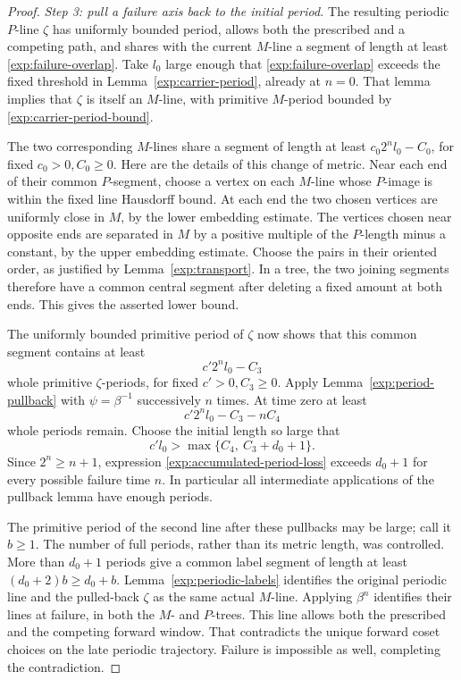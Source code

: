 \begin{proof}
\smallskip\noindent
\emph{Step 3: pull a failure axis back to the initial period.}
The resulting periodic $P$-line $\zeta$ has uniformly bounded period,
allows both the prescribed and a competing path, and shares with the current $M$-line a segment of length at least
\eqref{exp:failure-overlap}.
Take $l_0$ large enough that \eqref{exp:failure-overlap} exceeds
the fixed threshold in Lemma~\ref{exp:carrier-period}, already at
$n=0$. That lemma implies
that $\zeta$ is itself an $M$-line, with primitive
$M$-period bounded by \eqref{exp:carrier-period-bound}.

The two corresponding $M$-lines share a segment of length at
least $c_0 2^n l_0-C_0$, for fixed $c_0>0,C_0\ge0$.
Here are the details of this change of metric. Near each end of
their common $P$-segment, choose a vertex on each $M$-line whose
$P$-image is within the fixed line Hausdorff bound. At each end
the two chosen vertices are uniformly close in $M$, by the
lower embedding estimate. The vertices chosen near opposite
ends are separated in $M$ by a positive multiple of the
$P$-length minus a constant, by the upper embedding estimate.
Choose the pairs in their oriented order, as justified by
Lemma~\ref{exp:transport}. In a tree, the two joining segments
therefore have a common central segment after deleting a fixed
amount at both ends. This gives the asserted lower bound.

The uniformly bounded primitive period of $\zeta$ now shows
that this common segment contains at least
\begin{equation}
 c'2^n l_0-C_3
 \label{exp:initial-period-count}
\end{equation}
whole primitive $\zeta$-periods, for fixed $c'>0,C_3\ge0$.
Apply Lemma~\ref{exp:period-pullback} with $\psi=\beta^{-1}$
successively $n$ times. At time zero at least
\begin{equation}
 c'2^n l_0-C_3-nC_4
 \label{exp:accumulated-period-loss}
\end{equation}
whole periods remain. Choose the initial length so large that
\begin{equation}
 c'l_0>\max\{C_4,\ C_3+d_0+1\}.
 \label{exp:uniform-in-time}
\end{equation}
Since $2^n\ge n+1$, expression
\eqref{exp:accumulated-period-loss} exceeds $d_0+1$ for every
possible failure time $n$. In particular all intermediate
applications of the pullback lemma have enough periods.

The primitive period of the second line after these pullbacks
may be large; call it $b\ge1$. The number of full periods,
rather than its metric length, was controlled. More than
$d_0+1$ periods give a common label segment of length at least
$(d_0+2)b\ge d_0+b$. Lemma~\ref{exp:periodic-labels} identifies
the original periodic line and the pulled-back $\zeta$ as the
same actual $M$-line. Applying $\beta^n$ identifies their
lines at failure, in both the $M$- and $P$-trees. This line
allows both the prescribed and the competing forward window.
That contradicts the unique forward coset choices on the late
periodic trajectory. Failure is impossible as well, completing
the contradiction.
\end{proof}

